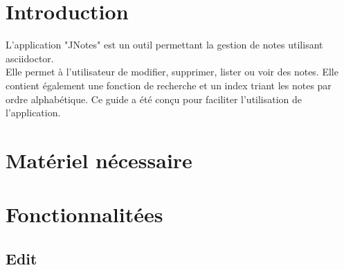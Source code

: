 \documentclass[a4paper,11pt]{article}
\title{\vspace{13em}{\huge Manuel utilisateur}}
\author{Clément Caumes - Mehdi Merimi - Sarah Ngoc-Mai Pho - Maxime Gonthier\\
		\vspace{2em}\\
		JNotes
		\vspace{2em}}
\begin{document}
	
	\clearpage
	\maketitle\vspace{13em}
\newpage
\tableofcontents
\newpage\clearpage{}
	
	\section{Introduction}
		L'application "JNotes" est un outil permettant la gestion de notes utilisant asciidoctor.\\
		Elle permet à l'utilisateur de modifier, supprimer, lister ou voir des notes. Elle contient également une fonction de recherche et un index triant les notes par ordre alphabétique.
		Ce guide a été conçu pour faciliter l'utilisation de l'application.
	
	\section{Matériel nécessaire}
	
		
	\section{Fonctionnalitées}
		\subsection{Edit}
			
			
	
\end{document}

